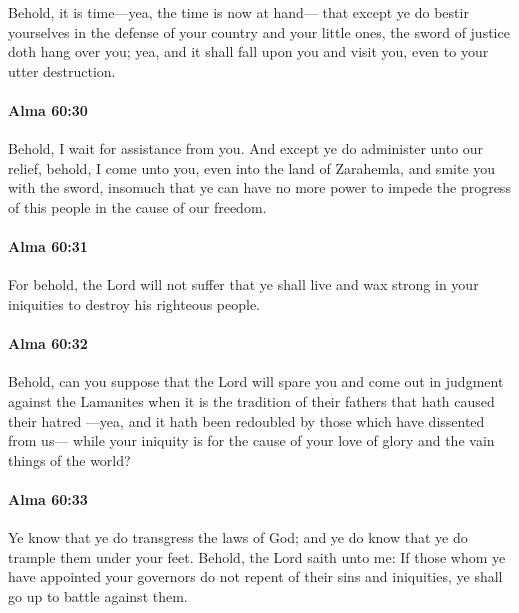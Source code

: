 			Behold, it is time---yea, the time is now at hand---
			that except ye do bestir yourselves
			in the defense of your country and your little ones,
			the sword of justice doth hang over you;
			yea, and it shall fall upon you and visit you,
			even to your utter destruction.

		\paragraph{Alma 60:30} %
			\label{ALMA-60-30}

			Behold, I wait for assistance from you.
			And except ye do administer unto our relief,
			behold, I come unto you, even into the land of Zarahemla,
			and smite you with the sword,
			insomuch that ye can have no more power
			to impede the progress of this people in the cause of our freedom.

		\paragraph{Alma 60:31} %
			\label{ALMA-60-31}

			For behold, the Lord will not suffer
			that ye shall live and wax strong in your iniquities to destroy his righteous people.

		\paragraph{Alma 60:32} %
			\label{ALMA-60-32}

			Behold, can you suppose that the Lord will spare you
			and come out in judgment against the Lamanites
			when it is the tradition of their fathers that hath caused their hatred
			---yea, and it hath been redoubled by those which have dissented from us---
			while your iniquity is for the cause of your love of glory
			and the vain things of the world?

		\paragraph{Alma 60:33} %
			\label{ALMA-60-33}

			Ye know that ye do transgress the laws of God;
			and ye do know that ye do trample them under your feet.
			Behold, the Lord saith unto me:
			If those whom ye have appointed your governors
			do not repent of their sins and iniquities,
			ye shall go up to battle against them.

